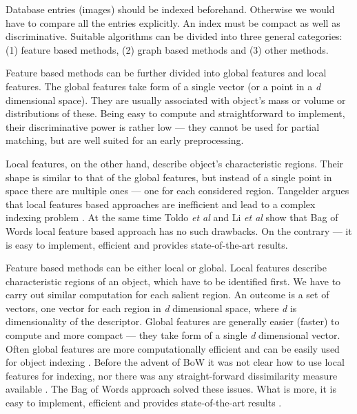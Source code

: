 		Database entries (images) should be indexed beforehand. Otherwise we would have to compare all the entries explicitly. An index must be compact as well as discriminative. Suitable algorithms can be divided into three general categories: (1) feature based methods, (2) graph based methods and (3) other methods.

		Feature based methods can be further divided into global features and local features. The global features take form of a single vector (or a point in a \emph{d} dimensional space). They are usually associated with object's mass or volume or distributions of these. Being easy to compute and straightforward to implement, their discriminative power is rather low --- they cannot be used for partial matching, but are well suited for an early preprocessing. 
		
		Local features, on the other hand, describe object's characteristic regions. Their shape is similar to that of the global features, but instead of a single point in space there are multiple ones --- one for each considered region. Tangelder argues that local features based approaches are inefficient and lead to a complex indexing problem \cite{tangelder2008survey}. At the same time Toldo \emph{et al} and Li \emph{et al} show that Bag of Words local feature based approach has no such drawbacks. On the contrary --- it is easy to implement, efficient and provides state-of-the-art results.
		
		Feature based methods can be either local or global. Local features describe characteristic regions of an object, which have to be identified first. We have to carry out similar computation for each salient region. An outcome is a set of vectors, one vector for each region in \emph{d} dimensional space, where \emph{d} is dimensionality of the descriptor. Global features are generally easier (faster) to compute and more compact --- they take form of a single \emph{d} dimensional vector. Often global features are more computationally efficient and can be easily used for object indexing . Before the advent of BoW it was not clear how to use local features for indexing, nor there was any straight-forward dissimilarity measure available \cite{tangelder2008survey}. The Bag of Words approach solved these issues. What is more, it is easy to implement, efficient and provides state-of-the-art results \cite{li2010investigating}.
		
